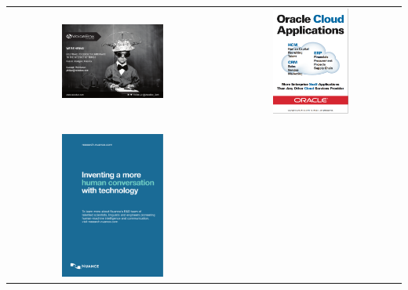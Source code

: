\newpage
\begin{center}
\begin{tabular}{cc}
\includegraphics[width=0.5\textwidth]{content/ads/voicebox.pdf} \hspace{0.2cm} 
& \includegraphics[width=0.44\textwidth]{content/ads/oracle-0.png} \\ \\ \\ \\ 

\includegraphics[width=0.5\textwidth]{content/ads/Nuance-ACL-Ad-03.pdf} 
& \\
\end{tabular}
\end{center}


%
%

